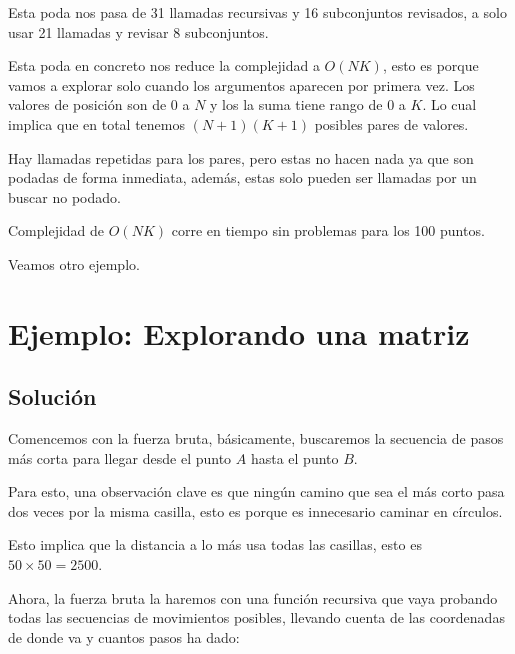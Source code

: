 Esta poda nos pasa de 31 llamadas recursivas y 16 subconjuntos revisados, a solo usar 21 llamadas y revisar 8 subconjuntos.

Esta poda en concreto nos reduce la complejidad a \(O(NK)\), esto es porque vamos a explorar solo cuando los argumentos aparecen por primera vez. Los valores de posición son de \(0\) a \(N\) y los la suma tiene rango de \(0\) a \(K\). Lo cual implica que en total tenemos \((N+1)(K+1)\) posibles pares de valores. 

Hay llamadas repetidas para los pares, pero estas no hacen nada ya que son podadas de forma inmediata, además, estas solo pueden ser llamadas por un buscar no podado.

Complejidad de \(O(NK)\) corre en tiempo sin problemas para los 100 puntos.

Veamos otro ejemplo.

\section*{Ejemplo: Explorando una matriz}



\subsection*{Solución}
Comencemos con la fuerza bruta, básicamente, buscaremos la secuencia de pasos más corta para llegar desde el punto \(A\) hasta el punto \(B\).

Para esto, una observación clave es que ningún camino que sea el más corto pasa dos veces por la misma casilla, esto es porque es innecesario caminar en círculos.

Esto implica que la distancia a lo más usa todas las casillas, esto es \(50\times50=2500\).

Ahora, la fuerza bruta la haremos con una función recursiva que vaya probando todas las secuencias de movimientos posibles, llevando cuenta de las coordenadas de donde va y cuantos pasos ha dado:

